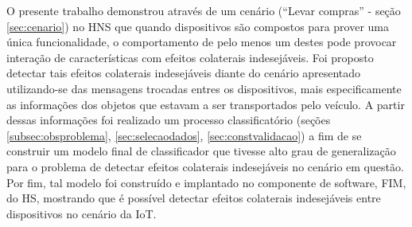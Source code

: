 O presente trabalho demonstrou através de um cenário (``Levar compras'' - seção \ref{sec:cenario}) no HNS que quando dispositivos são compostos para prover uma única funcionalidade, o comportamento de pelo menos um destes pode provocar interação de características com efeitos colaterais indesejáveis. Foi proposto detectar tais efeitos colaterais indesejáveis diante do cenário apresentado utilizando-se das mensagens trocadas entres os dispositivos, mais especificamente as informações dos objetos que estavam a ser transportados pelo veículo. A partir dessas informações foi realizado um processo classificatório (seções \ref{subsec:obsproblema}, \ref{sec:selecaodados}, \ref{sec:constvalidacao}) a fim de se construir um modelo final de classificador que tivesse alto grau de generalização para o problema de detectar efeitos colaterais indesejáveis no cenário em questão. Por fim, tal modelo foi construído e implantado no componente de software, FIM, do HS, mostrando que é possível detectar efeitos colaterais indesejáveis entre dispositivos no cenário da IoT.

